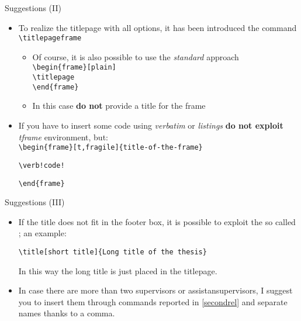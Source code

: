 \begin{frame}[fragile]{Suggestions (II)}
\begin{itemize}
\item To realize the titlepage with all options, it has been introduced the command \verb!\titlepageframe!
\begin{itemize}
\item Of course, it is also possible to use the \emph{standard} approach\\
\verb!\begin{frame}[plain]!\\
\verb!\titlepage! \\
\verb!\end{frame}!
\item In this case \textbf{do not} provide a title for the frame
\end{itemize}
\item If you have to insert some code using \emph{verbatim} or \emph{listings} \textbf{do not exploit} \emph{tframe} environment, but:\\
\verb!\begin{frame}[t,fragile]{title-of-the-frame}!
\begin{verbatim}
\verb!code!
\end{verbatim}
\verb!\end{frame}!
\end{itemize}
\end{frame}

\begin{frame}[t,fragile]{Suggestions (III)}
\begin{itemize}
\item If the title does not fit in the footer box, it is possible to exploit the so called ; an example:
\begin{verbatim}
\title[short title]{Long title of the thesis}
\end{verbatim}
In this way the long title is just placed in the titlepage.
\item In case there are more than two supervisors or assistansupervisors, I suggest you to insert them through commands reported in \ref{secondrel} and separate names thanks to a comma.
\end{itemize}
\end{frame}


